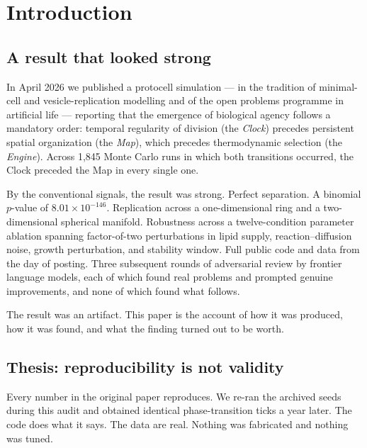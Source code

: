 \documentclass[11pt,letterpaper]{article}
\begin{document}
\begin{abstract}
\vspace{6pt}
\noindent\textbf{Keywords:} artificial life; protocell models;
measurement artifact; phase detection; Simpson's paradox;
reproducibility; self-correction
\end{abstract}

\section{Introduction}

\subsection{A result that looked strong}

In April 2026 we published a protocell simulation --- in the tradition
of minimal-cell and vesicle-replication modelling
\citep{szostak2001,hanczyc2003} and of the open problems programme in
artificial life \citep{bedau2000} --- reporting that the emergence of
biological agency follows a mandatory order: temporal
regularity of division (the \emph{Clock}) precedes persistent spatial
organization (the \emph{Map}), which precedes thermodynamic selection
(the \emph{Engine}). Across 1{,}845 Monte Carlo runs in which both
transitions occurred, the Clock preceded the Map in every single one.

By the conventional signals, the result was strong. Perfect
separation. A binomial $p$-value of $8.01 \times 10^{-146}$. Replication
across a one-dimensional ring and a two-dimensional spherical manifold.
Robustness across a twelve-condition parameter ablation spanning
factor-of-two perturbations in lipid supply, reaction--diffusion noise,
growth perturbation, and stability window. Full public code and data
from the day of posting. Three subsequent rounds of adversarial review
by frontier language models, each of which found real problems and
prompted genuine improvements, and none of which found what follows.

The result was an artifact. This paper is the account of how it was
produced, how it was found, and what the finding turned out to be worth.

\subsection{Thesis: reproducibility is not validity}

Every number in the original paper reproduces. We re-ran the archived
seeds during this audit and obtained identical phase-transition ticks a
year later. The code does what it says. The data are real. Nothing was
fabricated and nothing was tuned.
\end{document}
